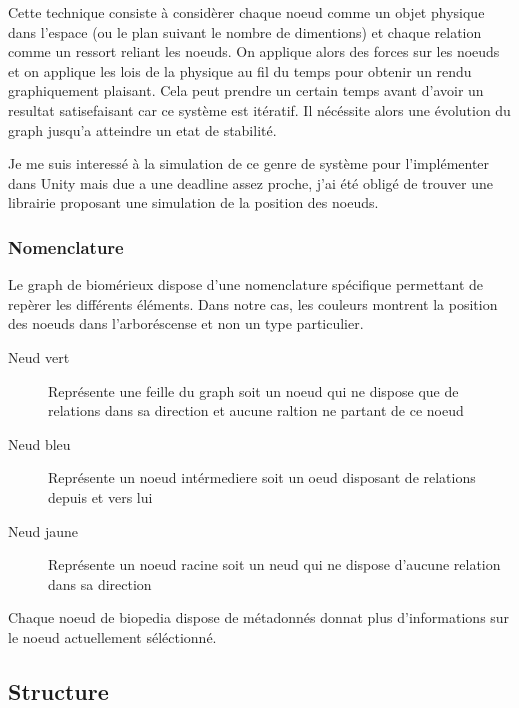 Cette technique consiste à considèrer chaque noeud comme un objet physique dans l'espace (ou le plan suivant le nombre de dimentions) et chaque relation comme un ressort reliant les noeuds.
On applique alors des forces sur les noeuds et on applique les lois de la physique au fil du temps pour obtenir un rendu graphiquement plaisant.
Cela peut prendre un certain temps avant d'avoir un resultat satisefaisant car ce système est itératif.
Il nécéssite alors une évolution du graph jusqu'a atteindre un etat de stabilité.

Je me suis interessé à la simulation de ce genre de système pour l'implémenter dans Unity mais due a une deadline assez proche, j'ai été obligé de trouver une librairie proposant une simulation de la position des noeuds.

\subsubsection{Nomenclature}
\label{biomerieuxBiopediaNomenclature}

Le graph de biomérieux dispose d'une nomenclature spécifique permettant de repèrer les différents éléments.
Dans notre cas, les couleurs montrent la position des noeuds dans l'arboréscense et non un type particulier.

\begin{description}
    \item[Neud vert] Représente une feille du graph soit un noeud qui ne dispose que de relations dans sa direction et aucune raltion ne partant de ce noeud
    \item[Neud bleu] Représente un noeud intérmediere soit un oeud disposant de relations depuis et vers lui
    \item[Neud jaune] Représente un noeud racine soit un neud qui ne dispose d'aucune relation dans sa direction
\end{description}

Chaque noeud de biopedia dispose de métadonnés donnat plus d'informations sur le noeud actuellement séléctionné.

\subsection{Structure}
\label{biomerieuxBiopediaStructure}

